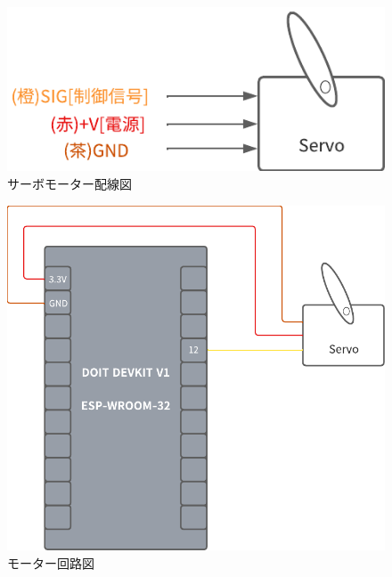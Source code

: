           \begin{figure}[htbp]
            \centering
            \includegraphics[scale=1.96]
            {figures/ServoMotorWritingDiagram.png}
            \caption{サーボモーター配線図}
            \label{fig:サーボモーター配線図}
          \end{figure}

          \begin{figure}[htbp]
            \centering
            \includegraphics[scale=1.26]
            {figures/MotorCircuitDiagram.png}
            \caption{モーター回路図}
            \label{fig:モーター回路図}
          \end{figure}
      
